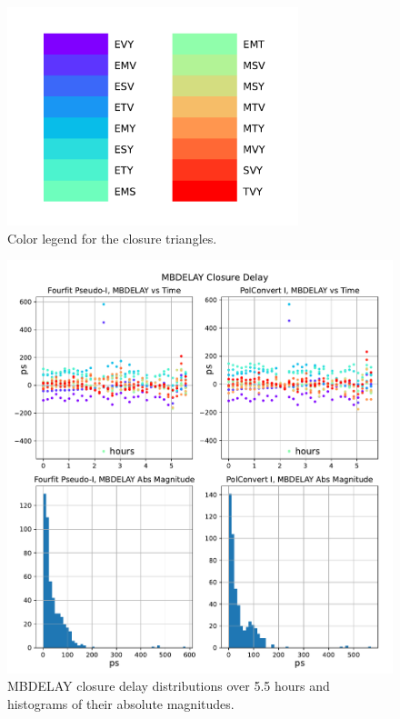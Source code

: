 \documentclass[letterpaper,twoside,12pt]{article}
\begin{document}
\begin{figure}[h!]
  \centering
  \includegraphics[width=20pc]{Triangle_color_legend.pdf}
  \caption{\small Color legend for the closure triangles.}
  \label{col_legend}
\end{figure}


\begin{figure}[h!]
  \centering
  \includegraphics[width=35pc]{MBDELAY_Closure_Delay.pdf}
  \caption{\small MBDELAY closure delay distributions over 5.5 hours and histograms of their absolute magnitudes.}
  \label{mbd}
\end{figure}
\end{document}
